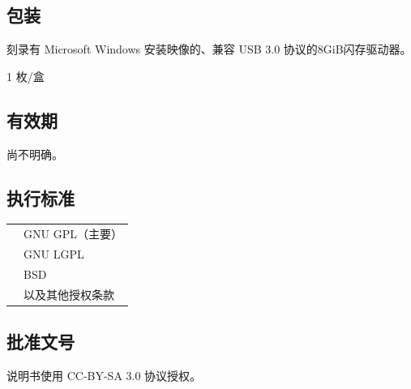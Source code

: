 \documentclass{article}
\begin{document}
\begin{multicols*}{3}
	\begin{tcolorbox}
	\section*{包装}
	\end{tcolorbox}

	刻录有 Microsoft Windows 安装映像的、兼容 USB 3.0 协议的8GiB闪存驱动器。

	1 枚/盒

	\medskip


	\begin{tcolorbox}
	\section*{有效期}
	\end{tcolorbox}

	尚不明确。

	\medskip


	\begin{tcolorbox}
	\section*{执行标准}
	\end{tcolorbox}
	\begin{tabularx}{\linewidth}{@{}ll@{}}
		\multirow{4}{*}{}{开源许可证：} & GNU GPL（主要）\\
		~ & GNU LGPL \\
		~ & BSD \\
		~ & 以及其他授权条款 \\
	\end{tabularx}

	\medskip


	\begin{tcolorbox}
	\section*{批准文号}
	\end{tcolorbox}

	说明书使用 CC-BY-SA 3.0 协议授权。

	\medskip


%
%



\end{multicols*}
\end{document}
